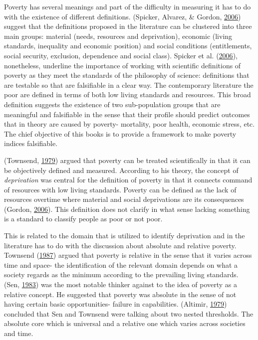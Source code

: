 \documentclass[]{book}
\begin{document}
Poverty has several meanings and part of the difficulty in measuring it has to do with the existence of different definitions. (Spicker, Alvarez, \& Gordon, \protect\hyperlink{ref-Spicker2006}{2006}) suggest that the definitions proposed in the literature can be clustered into three main groups: material (needs, resources and deprivation), economic (living standards, inequality and economic position) and social conditions (entitlements, social security, exclusion, dependence and social class). Spicker et al. (\protect\hyperlink{ref-Spicker2006}{2006}), nonetheless, underline the importance of working with scientific definitions of poverty as they meet the standards of the philosophy of science: definitions that are testable so that are falsifiable in a clear way. The contemporary literature the poor are defined in terms of both low living standards and resources. This broad definition suggests the existence of two sub-population groups that are meaningful and falsifiable in the sense that their profile should predict outcomes that in theory are caused by poverty- mortality, poor health, economic stress, etc. The chief objective of this books is to provide a framework to make poverty indices falsifiable.

(Townsend, \protect\hyperlink{ref-Townsend1979}{1979}) argued that poverty can be treated scientifically in that it can be objectively defined and measured. According to his theory, the concept of \emph{deprivation} was central for the definition of poverty in that it connects command of resources with low living standards. Poverty can be defined as the lack of resources overtime where material and social deprivations are its consequences (Gordon, \protect\hyperlink{ref-Gordon2006}{2006}). This definition does not clarify in what sense lacking something is a standard to classify people as poor or not poor.

This is related to the domain that is utilized to identify deprivation and in the literature has to do with the discussion about absolute and relative poverty. Townsend (\protect\hyperlink{ref-Townsend1987}{1987}) argued that poverty is relative in the sense that it varies across time and space- the identification of the relevant domain depends on what a society regards as the minimum according to the prevailing living standards. (Sen, \protect\hyperlink{ref-Sen1983}{1983}) was the most notable thinker against to the idea of poverty as a relative concept. He suggested that poverty was absolute in the sense of not having certain basic opportunities- failure in capabilities. (Altimir, \protect\hyperlink{ref-Altimir1979}{1979}) concluded that Sen and Townsend were talking about two nested thresholds. The absolute core which is universal and a relative one which varies across societies and time.
\end{document}
